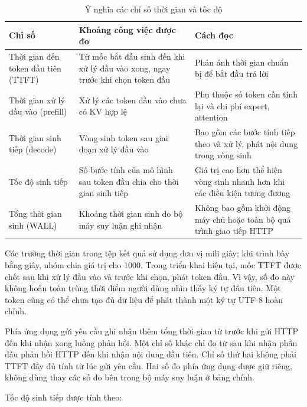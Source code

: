 \begin{table}[htbp]
\centering
\caption{Ý nghĩa các chỉ số thời gian và tốc độ}
\small
\setlength{\tabcolsep}{3pt}
\begin{tabularx}{\textwidth}{>{\RaggedRight\arraybackslash}p{4.4cm} >{\RaggedRight\arraybackslash}p{5cm} >{\RaggedRight\arraybackslash}X}
\toprule
\textbf{Chỉ số} & \textbf{Khoảng công việc được đo} & \textbf{Cách đọc} \\
\midrule
Thời gian đến token đầu tiên (TTFT) & Từ mốc bắt đầu sinh đến khi xử lý đầu vào xong, ngay trước khi chọn token đầu & Phản ánh thời gian chuẩn bị để bắt đầu trả lời \\
Thời gian xử lý đầu vào (prefill) & Xử lý các token đầu vào chưa có KV hợp lệ & Phụ thuộc số token cần tính lại và chi phí expert, attention \\
Thời gian sinh tiếp (decode) & Vòng sinh token sau giai đoạn xử lý đầu vào & Bao gồm các bước tính tiếp theo và xử lý, phát nội dung trong vòng sinh \\
Tốc độ sinh tiếp & Số bước tính của mô hình sau token đầu chia cho thời gian sinh tiếp & Giá trị cao hơn thể hiện vòng sinh nhanh hơn khi các điều kiện tương đương \\
Tổng thời gian sinh (WALL) & Khoảng thời gian sinh do bộ máy suy luận ghi nhận & Không bao gồm khởi động máy chủ hoặc toàn bộ quá trình giao tiếp HTTP \\
\bottomrule
\end{tabularx}


\end{table}



Các trường thời gian trong tệp kết quả sử dụng đơn vị mili giây; khi trình bày bằng giây, nhóm chia giá trị cho 1000. Trong triển khai hiện tại, mốc TTFT được chốt sau khi xử lý đầu vào và trước khi chọn, phát token đầu. Vì vậy, số đo này không hoàn toàn trùng thời điểm người dùng nhìn thấy ký tự đầu tiên. Một token cũng có thể chưa tạo đủ dữ liệu để phát thành một ký tự UTF-8 hoàn chỉnh.

Phía ứng dụng gửi yêu cầu ghi nhận thêm tổng thời gian từ trước khi gửi HTTP đến khi nhận xong luồng phản hồi. Một chỉ số khác chỉ đo từ sau khi nhận phần đầu phản hồi HTTP đến khi nhận nội dung đầu tiên. Chỉ số thứ hai không phải TTFT đầy đủ tính từ lúc gửi yêu cầu. Hai số đo phía ứng dụng được giữ riêng, không dùng thay các số đo bên trong bộ máy suy luận ở bảng chính.

Tốc độ sinh tiếp được tính theo:

